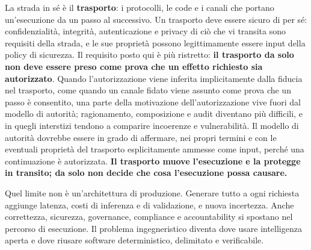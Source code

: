\documentclass[10pt,oneside,openany]{book}
\begin{document}
{\begin{center}
{}
\end{center}

\begin{notebox}
La strada in sé è il \textbf{trasporto}: i protocolli, le code e i canali che portano un'esecuzione da un passo al successivo. Un trasporto deve essere sicuro di per sé: confidenzialità, integrità, autenticazione e privacy di ciò che vi transita sono requisiti della strada, e le sue proprietà possono legittimamente essere input della policy di sicurezza. Il requisito posto qui è più ristretto: \textbf{il trasporto da solo non deve essere preso come prova che un effetto richiesto sia autorizzato}. Quando l'autorizzazione viene inferita implicitamente dalla fiducia nel trasporto, come quando un canale fidato viene assunto come prova che un passo è consentito, una parte della motivazione dell'autorizzazione vive fuori dal modello di autorità; ragionamento, composizione e audit diventano più difficili, e in quegli interstizi tendono a comparire incoerenze e vulnerabilità. Il modello di autorità dovrebbe essere in grado di affermare, nei propri termini e con le eventuali proprietà del trasporto esplicitamente ammesse come input, perché una continuazione è autorizzata. \textbf{Il trasporto muove l'esecuzione e la protegge in transito; da solo non decide che cosa l'esecuzione possa causare.}
\end{notebox}

Quel limite non è un'architettura di produzione. Generare tutto a ogni richiesta aggiunge latenza, costi di inferenza e di validazione, e nuova incertezza. Anche correttezza, sicurezza, governance, compliance e accountability si spostano nel percorso di esecuzione. Il problema ingegneristico diventa dove usare intelligenza aperta e dove riusare software deterministico, delimitato e verificabile.

}
\end{document}
